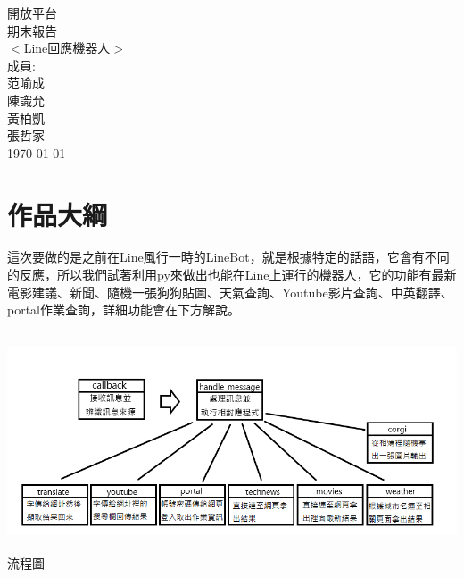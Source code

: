 \documentclass{scrreprt}
\date{}
\begin{document}
\begin{CJK}{UTF8}{bkai}
\begin{center}
    \begin{bfseries}
        \Huge{開放平台\\期末報告}\\
        \vspace{3.8cm}
        $<$Line回應機器人$>$\\
        \vspace{1.9cm}
        \LARGE{成員:}\\
        \vspace{1.0cm}
        范喻成\\
        \vspace{0.5cm}
        陳識允\\
        \vspace{0.5cm}
        黃柏凱\\
        \vspace{0.5cm}
        張哲家\\
        \vspace{0.5cm}
        \today\\
    \end{bfseries}
\end{center}

\tableofcontents

\chapter{作品大綱}

這次要做的是之前在Line風行一時的LineBot，就是根據特定的話語，它會有不同的反應，所以我們試著利用py來做出也能在Line上運行的機器人，它的功能有{\color{red}最新電影建議}、{\color{red}新聞}、{\color{red}隨機一張狗狗貼圖}、{\color{red}天氣查詢}、{\color{red}Youtube影片查詢}、{\color{red}中英翻譯}、{\color{red}portal作業查詢}，詳細功能會在下方解說。

\begin{center}
\includegraphics[width=15cm,height=6.5cm]{flow.png}
\\流程圖
\end{center}


\end{CJK}
\end{document}
